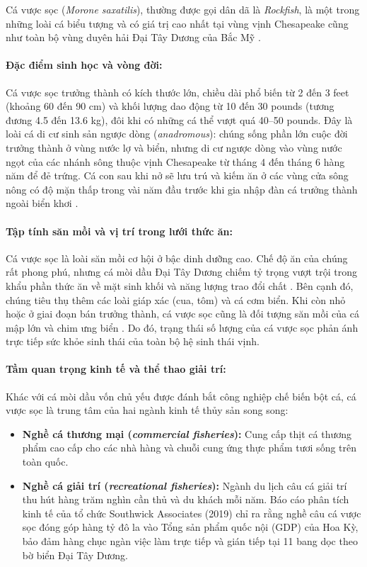 Cá vược sọc (\textit{Morone saxatilis}), thường được gọi dân dã là \textit{Rockfish}, là một trong những loài cá biểu tượng và có giá trị cao nhất tại vùng vịnh Chesapeake cũng như toàn bộ vùng duyên hải Đại Tây Dương của Bắc Mỹ \cite{cbp2021stripedbass}.

\paragraph{Đặc điểm sinh học và vòng đời:}
Cá vược sọc trưởng thành có kích thước lớn, chiều dài phổ biến từ 2 đến 3 feet (khoảng 60 đến 90 cm) và khối lượng dao động từ 10 đến 30 pounds (tương đương 4.5 đến 13.6 kg), đôi khi có những cá thể vượt quá 40--50 pounds. Đây là loài cá di cư sinh sản ngược dòng (\textit{anadromous}): chúng sống phần lớn cuộc đời trưởng thành ở vùng nước lợ và biển, nhưng di cư ngược dòng vào vùng nước ngọt của các nhánh sông thuộc vịnh Chesapeake từ tháng 4 đến tháng 6 hàng năm để đẻ trứng. Cá con sau khi nở sẽ lưu trú và kiếm ăn ở các vùng cửa sông nông có độ mặn thấp trong vài năm đầu trước khi gia nhập đàn cá trưởng thành ngoài biển khơi \cite{robichaud1996spawning}.

\paragraph{Tập tính săn mồi và vị trí trong lưới thức ăn:}
Cá vược sọc là loài săn mồi cơ hội ở bậc dinh dưỡng cao. Chế độ ăn của chúng rất phong phú, nhưng cá mòi dầu Đại Tây Dương chiếm tỷ trọng vượt trội trong khẩu phần thức ăn về mặt sinh khối và năng lượng trao đổi chất \cite{walter2003diet}. Bên cạnh đó, chúng tiêu thụ thêm các loài giáp xác (cua, tôm) và cá cơm biển. Khi còn nhỏ hoặc ở giai đoạn bán trưởng thành, cá vược sọc cũng là đối tượng săn mồi của cá mập lớn và chim ưng biển \cite{ellis2003diet, glass2009osprey}. Do đó, trạng thái số lượng của cá vược sọc phản ánh trực tiếp sức khỏe sinh thái của toàn bộ hệ sinh thái vịnh.

\paragraph{Tầm quan trọng kinh tế và thể thao giải trí:}
Khác với cá mòi dầu vốn chủ yếu được đánh bắt công nghiệp chế biến bột cá, cá vược sọc là trung tâm của hai ngành kinh tế thủy sản song song:
\begin{itemize}
    \item \textbf{Nghề cá thương mại (\textit{commercial fisheries}):} Cung cấp thịt cá thương phẩm cao cấp cho các nhà hàng và chuỗi cung ứng thực phẩm tươi sống trên toàn quốc.
    \item \textbf{Nghề cá giải trí (\textit{recreational fisheries}):} Ngành du lịch câu cá giải trí thu hút hàng trăm nghìn cần thủ và du khách mỗi năm. Báo cáo phân tích kinh tế của tổ chức Southwick Associates (2019) \cite{southwick2019economic} chỉ ra rằng nghề câu cá vược sọc đóng góp hàng tỷ đô la vào Tổng sản phẩm quốc nội (GDP) của Hoa Kỳ, bảo đảm hàng chục ngàn việc làm trực tiếp và gián tiếp tại 11 bang dọc theo bờ biển Đại Tây Dương.
\end{itemize}

